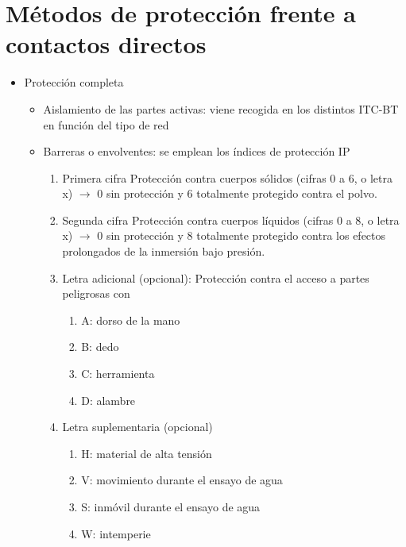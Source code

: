 \section{Métodos de protección frente a contactos directos}
\begin{itemize}
	\item Protección completa
	\begin{itemize}
		\item Aislamiento de las partes activas: viene recogida en los distintos ITC-BT en función del tipo de red
		
		\item Barreras o envolventes: se emplean los índices de protección IP
		\begin{enumerate}
			\item Primera cifra
			Protección contra
			cuerpos sólidos (cifras 0 a 6, o letra x) $\rightarrow$ 0 sin protección y 6 totalmente protegido contra el polvo.
			\item Segunda cifra
			Protección contra
			cuerpos líquidos (cifras 0 a 8, o letra x) $\rightarrow$ 0 sin protección y 8 totalmente protegido contra los efectos prolongados de la inmersión bajo presión.
			\item Letra adicional (opcional): Protección contra el acceso a partes peligrosas con
			\begin{enumerate}
				\item A: dorso de la mano
				\item B: dedo
				\item C: herramienta
				\item D: alambre
			\end{enumerate}
			\item Letra suplementaria (opcional)
			\begin{enumerate}
				\item H: material de alta tensión 
				\item V: movimiento durante el ensayo de agua
				\item S: inmóvil durante el ensayo de agua
				\item W: intemperie
			\end{enumerate}
		\end{enumerate}


\end{itemize}
\end{itemize}
